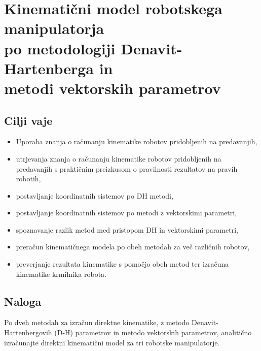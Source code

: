 
\chapter[Direktni kinematični model]{Kinematični model robotskega 
manipulatorja \\ po metodologiji Denavit-Hartenberga in \\ metodi vektorskih parametrov}

\begin{mdframed}[backgroundcolor=green!20, shadow=true,roundcorner=8pt]
\vspace{-0.35cm}
\section{Cilji vaje}
\begin{itemize}
\item Uporaba znanja o računanju kinematike robotov pridobljenih na predavanjih,
\item utrjevanja znanja o računanju kinematike robotov pridobljenih na predavanjih s praktičnim preizkusom o pravilnosti rezultatov na pravih robotih,
\item postavljanje koordinatnih sistemov po DH metodi,
\item postavljanje koordinatnih sistemov po metodi z vektorskimi parametri,
\item spoznavanje razlik metod med pristopom DH in vektorskimi parametri,
\item preračun kinematičnega modela po obeh metodah za več različnih robotov,
\item preverjanje rezultata kinematike s pomočjo obeh metod ter izračuna kinematike krmilnika robota.

\end{itemize}
\end{mdframed}

\section{Naloga}

Po dveh metodah za izračun direktne kinematike, z metodo Denavit-Hartenbergovih (D-H) parametrov in metodo vektorskih parametrov, analitično izračunajte direktni
kinematični model za tri robotske manipulatorje.

